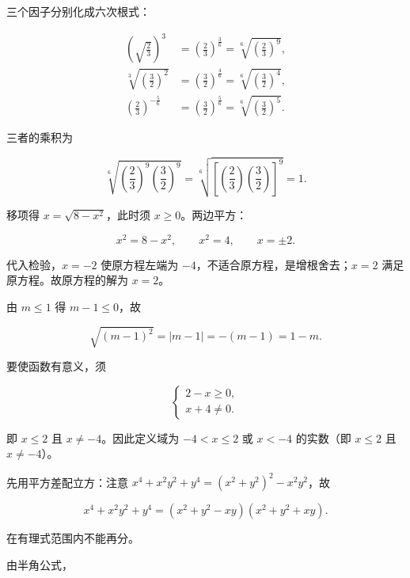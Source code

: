 \begin{answer}
三个因子分别化成六次根式：

\nopagebreak[4]
\[
\begin{aligned}
\left(\sqrt{\frac23}\right)^{3}
&=\left(\frac23\right)^{\frac36}
=\sqrt[6]{\left(\frac23\right)^{9}},\\
\sqrt[3]{\left(\frac32\right)^{2}}
&=\left(\frac32\right)^{\frac46}
=\sqrt[6]{\left(\frac32\right)^{4}},\\
\left(\frac23\right)^{-\frac56}
&=\left(\frac32\right)^{\frac56}
=\sqrt[6]{\left(\frac32\right)^{5}}.
\end{aligned}
\]

三者的乘积为

\nopagebreak[4]
\[
\sqrt[6]{\left(\frac23\right)^{9}\left(\frac32\right)^{9}}
=\sqrt[6]{\left[\left(\frac23\right)\left(\frac32\right)\right]^{9}}
=1.
\]


移项得 $x=\sqrt{8-x^2}$，此时须 $x\geqslant 0$。两边平方：

\nopagebreak[4]
\[
x^2=8-x^2,
\qquad
x^2=4,
\qquad
x=\pm2.
\]

代入检验，$x=-2$ 使原方程左端为 $-4$，不适合原方程，是增根舍去；$x=2$ 满足原方程。故原方程的解为 $x=2$。


由 $m\leqslant 1$ 得 $m-1\leqslant 0$，故

\nopagebreak[4]
\[
\sqrt{(m-1)^2}=|m-1|=-(m-1)=1-m.
\]


要使函数有意义，须

\nopagebreak[4]
\[
\begin{cases}
2-x\geqslant 0,\\
x+4\ne0.
\end{cases}
\]

即 $x\leqslant 2$ 且 $x\ne-4$。因此定义域为 $-4<x\leqslant 2$ 或 $x<-4$ 的实数（即 $x\leqslant 2$ 且 $x\ne-4$）。


先用平方差配立方：注意 $x^4+x^2y^2+y^4=(x^2+y^2)^2-x^2y^2$，故

\nopagebreak[4]
\[
x^4+x^2y^2+y^4
=(x^2+y^2-xy)(x^2+y^2+xy).
\]

在有理式范围内不能再分。


由半角公式，


\end{answer}
